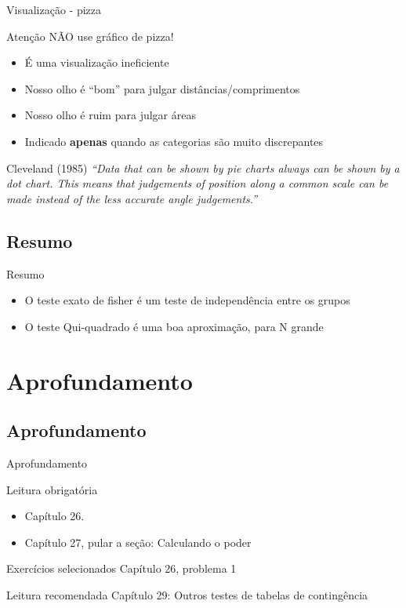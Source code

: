 \documentclass{beamer}
\begin{document}
\begin{frame}{Visualização - pizza}
  \begin{block}{Atenção}
    NÃO use gráfico de pizza!
  \end{block}
  \begin{itemize}
  \item É uma visualização ineficiente
  \item Nosso olho é ``bom'' para julgar distâncias/comprimentos
  \item Nosso olho é ruim para julgar áreas
  \item Indicado {\bf apenas} quando as categorias são muito discrepantes
  \end{itemize}
  \begin{block}{Cleveland (1985)}
    {\em ``Data that can be shown by pie charts always can be shown by a dot chart.
      This means that judgements of position along a common scale can be made instead of the less accurate angle judgements.''}
  \end{block}
\end{frame}

\subsection{Resumo}

\begin{frame}{Resumo}
  \begin{itemize}
  \item O teste exato de fisher é um teste de independência entre os grupos
  \item O teste Qui-quadrado é uma boa aproximação, para N grande
  \end{itemize}
\end{frame}

\section{Aprofundamento}

\subsection{Aprofundamento}

\begin{frame}{Aprofundamento}
  \begin{block}{Leitura obrigatória}
    \begin{itemize}
      \small
    \item Capítulo 26.
    \item Capítulo 27, pular a seção: Calculando o poder
    \end{itemize}
  \end{block}
  \begin{block}{Exercícios selecionados}
    \footnotesize
    Capítulo 26, problema 1
  \end{block}
  \begin{block}{Leitura recomendada}
    \small
    Capítulo 29: Outros testes de tabelas de contingência
  \end{block}
\end{frame}
\end{document}
